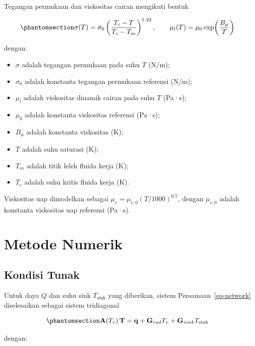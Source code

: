 \documentclass[
  indonesian,
  12pt,
  a4paper,
]{report}
\providecommand{\tightlist}{%
  \setlength{\itemsep}{0pt}\setlength{\parskip}{0pt}}
\begin{document}
Tegangan permukaan dan viskositas cairan mengikuti bentuk

\begin{equation}\protect\phantomsection\label{eq-sigma}{ \sigma(T)=\sigma_0\left(\frac{T_c-T}{T_c-T_m}\right)^{1.22}, \qquad
   \mu_l(T)=\mu_0\exp\!\left(\frac{B_\mu}{T}\right) }\end{equation}

dengan:

\begin{itemize}
\tightlist
\item
  \(\sigma\) adalah tegangan permukaan pada suhu \(T\) (N/m);
\item
  \(\sigma_0\) adalah konstanta tegangan permukaan referensi (N/m);
\item
  \(\mu_l\) adalah viskositas dinamik cairan pada suhu \(T\) (Pa·s);
\item
  \(\mu_0\) adalah konstanta viskositas referensi (Pa·s);
\item
  \(B_\mu\) adalah konstanta viskositas (K);
\item
  \(T\) adalah suhu saturasi (K);
\item
  \(T_m\) adalah titik leleh fluida kerja (K);
\item
  \(T_c\) adalah suhu kritis fluida kerja (K).
\end{itemize}

Viskositas uap dimodelkan sebagai \(\mu_v = \mu_{v,0}(T/1000)^{0.7}\),
dengan \(\mu_{v,0}\) adalah konstanta viskositas uap referensi (Pa·s).

\section{Metode Numerik}\label{metode-numerik}

\subsection{Kondisi Tunak}\label{kondisi-tunak}

Untuk daya \(Q\) dan suhu sink \(T_{\mathrm{sink}}\) yang diberikan,
sistem Persamaan~\ref{eq-network} diselesaikan sebagai sistem
tridiagonal

\begin{equation}\protect\phantomsection\label{eq-steady}{ \mathbf{A}(T_v)\,\mathbf{T} = \mathbf{q}
   + \mathbf{G}_{rad}T_v + \mathbf{G}_{sink}T_{\mathrm{sink}}
   }\end{equation}

dengan:
\end{document}
